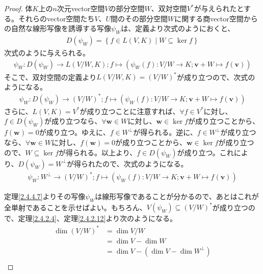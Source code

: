 \documentclass[dvipdfmx]{jsarticle}
\begin{document}
\begin{proof}
体$K$上の$n$次元vector空間$V$の部分空間$W$、双対空間$V^{*}$が与えられたとする。それらのvector空間たち$V$、$U$間のその部分空間$W$に関する商vector空間からの自然な線形写像を誘導する写像$\psi_{W}$は、定義より次式のようにおくと、
\begin{align*}
D\left( \psi_{W} \right) = \left\{ f \in L(V,K) \middle| W \subseteq \ker f \right\}
\end{align*}
次式のように与えられる。
\begin{align*}
\psi_{W}:D\left( \psi_{W} \right) \rightarrow L\left( {V}/{W},K \right);f \mapsto \left( \psi_{W}(f):{V}/{W} \rightarrow K;\mathbf{v} + W \mapsto f\left( \mathbf{v} \right) \right)
\end{align*}
そこで、双対空間の定義より$L\left( {V}/{W},K \right) = \left( {V}/{W} \right)^{*}$が成り立つので、次式のようになる。
\begin{align*}
\psi_{W}:D\left( \psi_{W} \right) \rightarrow \left( {V}/{W} \right)^{*};f \mapsto \left( \psi_{W}(f):{V}/{W} \rightarrow K;\mathbf{v} + W \mapsto f\left( \mathbf{v} \right) \right)
\end{align*}
さらに、$L(V,K) = V^{*}$が成り立つことに注意すれば、$\forall f \in V^{*}$に対し、$f \in D\left( \psi_{W} \right)$が成り立つなら、$\forall\mathbf{w} \in W$に対し、$\mathbf{w} \in \ker f$が成り立つことから、$f\left( \mathbf{w} \right) = 0$が成り立つ。ゆえに、$f \in W^{\bot}$が得られる。逆に、$f \in W^{\bot}$が成り立つなら、$\forall\mathbf{w} \in W$に対し、$f\left( \mathbf{w} \right) = 0$が成り立つことから、$\mathbf{w} \in \ker f$が成り立つので、$W \subseteq \ker f$が得られる。以上より、$f \in D\left( \psi_{W} \right)$が成り立つ。これにより、$D\left( \psi_{W} \right) = W^{\bot}$が得られたので、次式のようになる。
\begin{align*}
\psi_{W}:W^{\bot} \rightarrow \left( {V}/{W} \right)^{*};f \mapsto \left( \psi_{W}(f):{V}/{W} \rightarrow K;\mathbf{v} + W \mapsto f\left( \mathbf{v} \right) \right)
\end{align*}\par
定理\ref{2.4.4.7}よりその写像$\psi_{W}$は線形写像であることが分かるので、あとはこれが全単射であることを示せばよい。もちろん、$V\left( \psi_{W} \right) \subseteq \left( {V}/{W} \right)^{*}$が成り立つので、定理\ref{2.4.2.4}、定理\ref{2.4.2.12}より次のようになる。
\begin{align*}
\dim\left( {V}/{W} \right)^{*} &= \dim{V}/{W}\\
&= \dim V - \dim W\\
&= \dim V - \left( \dim V - \dim W^{\bot} \right)\\

\end{align*}
\end{proof}
\end{document}

